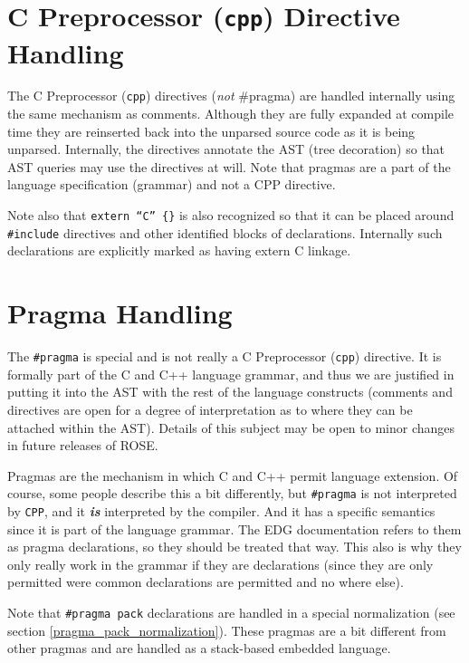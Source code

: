 \section {C Preprocessor ({\tt cpp}) Directive Handling}

    The C Preprocessor ({\tt cpp}) directives ({\em not} \#pragma) are handled internally using the same mechanism as
comments.  Although they are fully expanded at compile time they are reinserted back
into the unparsed source code as it is being unparsed.  Internally, the directives annotate the AST
(tree decoration) so that AST queries may use the directives at will.
Note that pragmas are a part of the language specification (grammar) and not a CPP directive.

  Note also that {\tt extern ``C'' \{\}} is also recognized so that it can be
placed around {\tt \#include} directives and other identified blocks of declarations.
Internally such declarations are explicitly marked as having extern C linkage.

\section {Pragma Handling}

The {\tt \#pragma} is special and is not really a C Preprocessor ({\tt cpp}) directive.
It is formally part of the C and C++ language grammar, and thus we are justified in putting it 
into the AST with the rest of the language constructs (comments and directives are open for 
a degree of interpretation as to where they can be attached within the AST). Details of
this subject may be open to minor changes in future releases of ROSE.

  Pragmas are the mechanism in which C and C++ permit language
extension.  Of course, some people describe this a bit differently,
but {\tt \#pragma} is not interpreted by {\tt CPP}, and it {\it {\bf is}} interpreted by the compiler.
And it has a specific semantics since it is part of the language grammar.
The EDG documentation refers to them as pragma declarations, so they should be 
treated that way. This also is why they only really work in the grammar if 
they are declarations (since they are only permitted were common declarations 
are permitted and no where else).

Note that {\tt \#pragma pack} declarations are handled in a special normalization
(see section \ref{pragma_pack_normalization}).  These pragmas are a bit different
from other pragmas and are handled as a stack-based embedded language.


